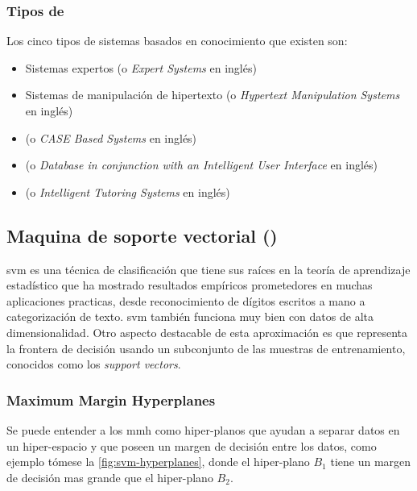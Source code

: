 \subsubsection{Tipos de } \label{ch:kbs-types}
Los cinco tipos de sistemas basados en conocimiento que existen son:
\begin{itemize}
  \item Sistemas expertos (o \textsl{Expert Systems} en inglés)
  \item Sistemas de manipulación de hipertexto (o \textsl{Hypertext Manipulation Systems} en inglés)
  \item (o \textsl{CASE Based Systems} en inglés)
  \item (o \textsl{Database in conjunction with an Intelligent User Interface} en inglés)
  \item (o \textsl{Intelligent Tutoring Systems} en inglés)
\end{itemize}

\subsubsection{} \label{ch:kbs-rule-based-system}


\subsection{Maquina de soporte vectorial ()} \label{sec:SVM}
\gls{svm} es una técnica de clasificación que tiene sus raíces en la teoría de aprendizaje estadístico que ha mostrado resultados empíricos prometedores en muchas aplicaciones practicas, desde reconocimiento de dígitos escritos a mano a categorización de texto. \gls{svm} también funciona muy bien con datos de alta dimensionalidad. Otro aspecto destacable de esta aproximación es que representa la frontera de decisión usando un subconjunto de las muestras de entrenamiento, conocidos como los \emph{support vectors}.

\subsubsection{Maximum Margin Hyperplanes}
Se puede entender a los \gls{mmh} como hiper-planos que ayudan a separar datos en un hiper-espacio y que poseen un margen de decisión entre los datos, como ejemplo tómese la \cref{fig:svm-hyperplanes}, donde el hiper-plano $B_1$ tiene un margen de decisión mas grande que el hiper-plano $B_2$.

